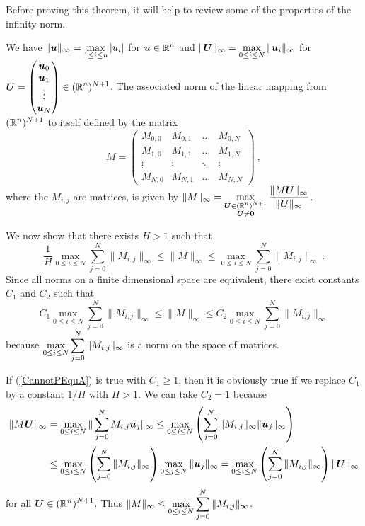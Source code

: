 \begin{rmk}
Before proving this theorem, it will help to
review some of the properties of the infinity norm.

We have $\displaystyle \|\bm{u} \|_\infty = \max_{1 \leq i \leq n} |u_i|$ for
$\displaystyle \bm{u}\in \mathbb{R}^n$ and
$\displaystyle \|\bm{U}\|_\infty = \max_{0 \leq i \leq N} \| \bm{u}_i \|_\infty$
for 
$\displaystyle \bm{U} = \begin{pmatrix}
\bm{u}_0 \\ \bm{u}_1 \\ \vdots \\ \bm{u}_N \end{pmatrix}
\in (\mathbb{R}^n)^{N+1}$.  The associated norm of the linear mapping
from $\displaystyle (\mathbb{R}^n)^{N+1}$ to itself defined by the matrix
\[
M = \begin{pmatrix}
M_{0,0} & M_{0,1} & \ldots & M_{0,N} \\
M_{1,0} & M_{1,1} & \ldots & M_{1,N} \\
 \vdots & \vdots & \ddots & \vdots \\
M_{N,0} & M_{N,1} & \ldots & M_{N,N}
\end{pmatrix} \ ,
\]
where the $M_{i,j}$ are \nn matrices, is given by
$\displaystyle \| M \|_\infty = \max_{\substack{\bm{U} \in (\mathbb{R}^n)^{N+1}\\
\bm{U} \neq \bm{0}}}
\frac{\|M \bm{U}\|_\infty}{\|\bm{U}\|_\infty}$.

We now show that there exists $H>1$ such that
\begin{equation} \label{CannotPEqu}
\frac{1}{H}  \max_{0\leq i \leq N} \sum_{j=0}^N \|M_{i,j}\|_\infty
\leq \| M \|_\infty \leq \max_{0\leq i \leq N}
\sum_{j=0}^N \|M_{i,j}\|_\infty \ .
\end{equation}
Since all norms on a finite dimensional space are
equivalent, there exist constants $C_1$ and $C_2$ such that
\begin{equation} \label{CannotPEquA}
C_1 \max_{0\leq i \leq N} \sum_{j=0}^N \|M_{i,j}\|_\infty
\leq \| M \|_\infty \leq C_2 \max_{0\leq i \leq N} \sum_{j=0}^N
\|M_{i,j}\|_\infty
\end{equation}
because
$\displaystyle \max_{0\leq i \leq N} \sum_{j=0}^N \|M_{i,j}\|_\infty$
is a norm on the space of  matrices.

If (\ref{CannotPEquA}) is true with $C_1 \geq 1$, then it is obviously
true if we replace $C_1$ by a constant $1/H$ with $H>1$.
We can take $C_2 = 1$ because
\begin{align*}
\| M \bm{U} \|_\infty
&= \max_{0 \leq i \leq N} \| \sum_{j=0}^N M_{i,j} \bm{u}_j \|_\infty
\leq \max_{0\leq i \leq N} \left( \sum_{j=0}^N \| M_{i,j}\|_\infty
\| \bm{u}_j \|_\infty \right) \\
&\leq \max_{0\leq i \leq N} \left( \sum_{j=0}^N \| M_{i,j}\|_\infty \right)
\max_{0 \leq j \leq N} \| \bm{u}_j \|_\infty
= \max_{0\leq i \leq N} \left( \sum_{j=0}^N \| M_{i,j} \|_\infty \right)
\| \bm{U} \|_\infty
\end{align*}
for all $\displaystyle \bm{U} \in (\mathbb{R}^n)^{N+1}$.  Thus
$\displaystyle \| M \|_\infty \leq
\max_{0\leq i \leq N} \sum_{j=0}^N \|M_{i,j}\|_\infty$.
\label{FDMrmkNorm}
\end{rmk}

